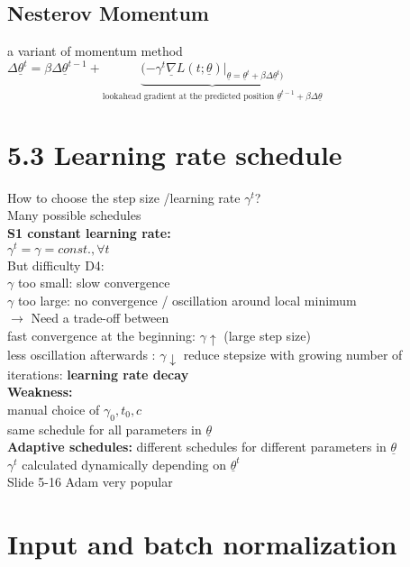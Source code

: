 \subsection{Nesterov Momentum}
a variant of momentum method \\
$  \Delta \underline{\theta} ^{t} =\beta \Delta \underline{\theta}^{t-1} +  \underbrace{(- \gamma^t \underline{ \nabla} L(t; \underline{\theta})|_{ \underline{\theta} = \underline{\theta}^t + \beta \Delta \underline{\theta}^t)}}_{\text{lookahead gradient at the predicted position } \underline{\theta}^{t-1} + \beta \Delta \underline{\theta}} $ 
\section{5.3 Learning rate schedule}
How to choose the step size /learning rate $  \gamma^t $?\\
Many possible schedules \\
\textbf{S1 constant learning rate:}\\
$ \gamma^t = \gamma = const., \forall t $\\
But difficulty D4: \\
\textbullet $  \gamma $ too small: slow convergence \\
\textbullet $  \gamma $ too large: no convergence / oscillation around local minimum\\
$\rightarrow$ Need a trade-off between \\
\textbullet fast convergence at the beginning: $  \gamma \uparrow $ (large step size) \\
\textbullet less oscillation afterwards : $  \gamma \downarrow $ reduce stepsize with growing number of iterations: \textbf{learning rate decay} \\
\textbf{Weakness:}\\
\textbullet manual choice of $ \gamma_0, t_0 , c $\\
\textbullet same schedule for all parameters in $ \underline{\theta} $ \\
\textbf{Adaptive schedules:}
\textbullet different schedules for different parameters in $  \underline{\theta} $\\
\textbullet $ \gamma^t  $ calculated dynamically depending on $ \underline{\theta}^t $ \\
Slide 5-16 Adam very popular 
\section{Input and batch normalization}
